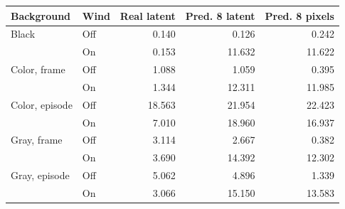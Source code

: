 \begin{tabular}{llrrr}
\toprule
\rowcolor{Navy!8}
Background & Wind & Real latent & Pred. 8 latent & Pred. 8 pixels \\
\midrule
Black & Off & 0.140 & 0.126 & 0.242 \\
 & On & 0.153 & 11.632 & 11.622 \\
Color, frame & Off & 1.088 & 1.059 & 0.395 \\
 & On & 1.344 & 12.311 & 11.985 \\
Color, episode & Off & 18.563 & 21.954 & 22.423 \\
 & On & 7.010 & 18.960 & 16.937 \\
Gray, frame & Off & 3.114 & 2.667 & 0.382 \\
 & On & 3.690 & 14.392 & 12.302 \\
Gray, episode & Off & 5.062 & 4.896 & 1.339 \\
 & On & 3.066 & 15.150 & 13.583 \\
\bottomrule
\end{tabular}
